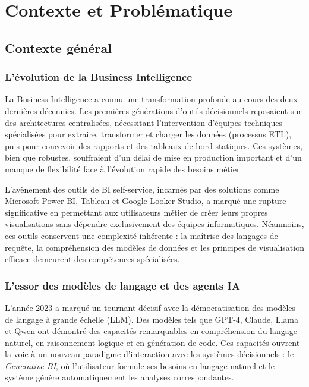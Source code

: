 \chapter{Contexte et Problématique}

\section{Contexte général}

\subsection{L'évolution de la Business Intelligence}

La Business Intelligence a connu une transformation profonde au cours des deux dernières décennies. Les premières générations d'outils décisionnels reposaient sur des architectures centralisées, nécessitant l'intervention d'équipes techniques spécialisées pour extraire, transformer et charger les données (processus ETL), puis pour concevoir des rapports et des tableaux de bord statiques. Ces systèmes, bien que robustes, souffraient d'un délai de mise en production important et d'un manque de flexibilité face à l'évolution rapide des besoins métier.

L'avènement des outils de BI self-service, incarnés par des solutions comme Microsoft Power BI, Tableau et Google Looker Studio, a marqué une rupture significative en permettant aux utilisateurs métier de créer leurs propres visualisations sans dépendre exclusivement des équipes informatiques. Néanmoins, ces outils conservent une complexité inhérente : la maîtrise des langages de requête, la compréhension des modèles de données et les principes de visualisation efficace demeurent des compétences spécialisées.

\subsection{L'essor des modèles de langage et des agents IA}

L'année 2023 a marqué un tournant décisif avec la démocratisation des modèles de langage à grande échelle (LLM). Des modèles tels que GPT-4, Claude, Llama et Qwen ont démontré des capacités remarquables en compréhension du langage naturel, en raisonnement logique et en génération de code. Ces capacités ouvrent la voie à un nouveau paradigme d'interaction avec les systèmes décisionnels : le \textit{Generative BI}, où l'utilisateur formule ses besoins en langage naturel et le système génère automatiquement les analyses correspondantes.

